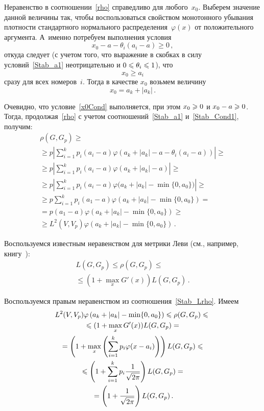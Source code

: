 \begin{multicols}{2}
Неравенство в соотношении~\eqref{rho} справедливо для любого~$x_0$.
Выберем значение данной величины так, чтобы воспользоваться
свойством монотонного убывания плотности стандартного нормального
распределения~$\varphi(x)$ от положительного аргумента. А~именно
потребуем выполнения условия
$$
x_0-a-\theta_i(a_i-a)\geqslant 0\,,
$$
откуда следует (с учетом того, что выражение в скобках
в силу условий~\eqref{Stab_a1} неотрицательно и $0\hm\leqslant\theta_i\hm\leqslant 1$),
что
\begin{equation}
x_0\geqslant a_i 
\label{x0Cond}
\end{equation}
сразу для всех номеров~$i$. Тогда в качестве  $x_0$ возьмем
величину
\begin{equation}
x_0=a_k+|a_k|\,. 
\label{x0}
\end{equation}

Очевидно, что условие~\eqref{x0Cond} выполняется,
при этом $x_0\hm\geqslant 0$ и $x_0-a\hm\geqslant 0$. Тогда, продолжая~\eqref{rho} с
учетом соотношений~\eqref{Stab_a1} и~\eqref{Stab_Cond1}, получим:
\begin{multline*}
\rho(G,G_p)\geqslant{}\\
{}\geqslant p\left|\sum\limits_{i=1}^k
p_i(a_i-a)\varphi\left(a_k+|a_k|-a-\theta_i(a_i-a)\right)\right|\geqslant{}\\
{}\geqslant p\left|\sum\limits_{i=1}^k p_i(a_i-a)\varphi\left(a_k+|a_k|-a\right)\right|
\geqslant{}\\
{}\geqslant p\left|\sum\limits_{i=1}^k
p_i(a_i-a)\varphi\Big(a_k+|a_k|-\min\{0,a_0\}\Big)\right|\geqslant{}\\
{}\geqslant p\sum\limits_{i=1}^k p_i(a_1-a)\varphi\left(a_k+|a_k|-\min\{0,a_0\}\right)
={}\\
{}=p(a_1-a)\varphi\left(a_k+|a_k|-\min\{0,a_0\}\right)\geqslant{}\\
{}\geqslant L^2(V,V_p)\varphi\left(a_k+|a_k|-\min\{0,a_0\}\right)\,.
\end{multline*}

Воспользуемся известным неравенством для мет\-ри\-ки Леви (см.,
например, книгу~\cite{Zolotarev1986}):
\begin{multline}
\label{Stab_Lrho} 
L(G,G_p)\leqslant\rho(G,G_p)\leqslant{}\\
{}\leqslant (1+\max\limits_x
G'(x))L(G,G_p)\,.
\end{multline}

Воспользуемся правым неравенством из соотношения~\eqref{Stab_Lrho}.
Имеем
\begin{multline*}
L^2(V,V_p)\varphi\left(a_k+|a_k|-\min\{0,a_0\}\right)\leqslant\rho(G,G_p)\leqslant{}\\
{}\leqslant (1+
\max\limits_x G'(x))L(G,G_p)={}\\
{}=\left(1+\max\limits_x \left(\sum\limits_{i=1}^k
p_i\varphi(x-a_i) \right)\right)L(G,G_p)\leqslant{}\\
{}\leqslant
\left(1+\sum\limits_{i=1}^k
p_i \displaystyle\frac{\displaystyle 1\mathstrut}{\displaystyle \sqrt{2\pi}\mathstrut}\right)L(G,G_p)={}\\
{}=\left(1+\displaystyle\frac{\displaystyle 1\mathstrut}{\displaystyle \sqrt{2\pi}\mathstrut}\right)L(G,G_p)\,.
\end{multline*}


\end{multicols}
